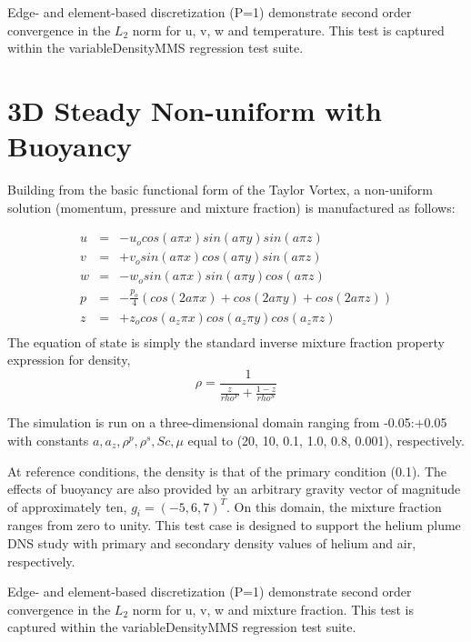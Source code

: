 Edge- and element-based discretization (P=1) demonstrate second order convergence
in the $L_2$ norm for u, v, w and temperature. This test is captured within the 
variableDensityMMS regression test suite.

\section{3D Steady Non-uniform with Buoyancy}

Building from the basic functional form of the Taylor Vortex,
a non-uniform solution (momentum, pressure and mixture fraction)
is manufactured as follows:

\begin{eqnarray}
  u &=& -u_o cos(a \pi x) sin(a \pi y ) sin(a \pi z) \nonumber \\
  v &=& +v_o sin(a \pi x) cos(a \pi y ) sin(a \pi z) \nonumber \\
  w &=& -w_o sin(a \pi x) sin(a \pi y ) cos(a \pi z) \nonumber \\
  p &=& -\frac{p_o}{4}( cos(2 a \pi x) + cos(2 a \pi y ) + cos(2 a \pi z) )  \nonumber \\
  z &=& +z_o cos(a_z \pi x) cos(a_z \pi y ) cos(a_z \pi z)  \nonumber \\
\label{3dNonIso}
\end{eqnarray}
%
The equation of state is simply the standard inverse mixture fraction 
property expression for density, 
\begin{equation}
  \rho = \frac{1} {\frac{z}{rho^P} + \frac{1-z}{rho^S} }
\label{idealGasEOS}
\end{equation}

The simulation is run on a three-dimensional domain ranging from -0.05:+0.05 with
constants $a, a_z, \rho^p, \rho^s, Sc, \mu$ equal to (20, 10, 0.1, 1.0, 0.8, 0.001),
respectively.

At reference conditions, the density is that of the primary condition (0.1). 
The effects of buoyancy are also provided by an arbitrary gravity vector 
of magnitude of approximately ten, $g_i = (-5, 6, 7)^T$. On this domain, the mixture 
fraction ranges from zero to unity. This test case is designed to support 
the helium plume DNS study with primary and secondary density values of helium
and air, respectively.

Edge- and element-based discretization (P=1) demonstrate second order convergence
in the $L_2$ norm for u, v, w and mixture fraction. This test is captured within the 
variableDensityMMS regression test suite.

